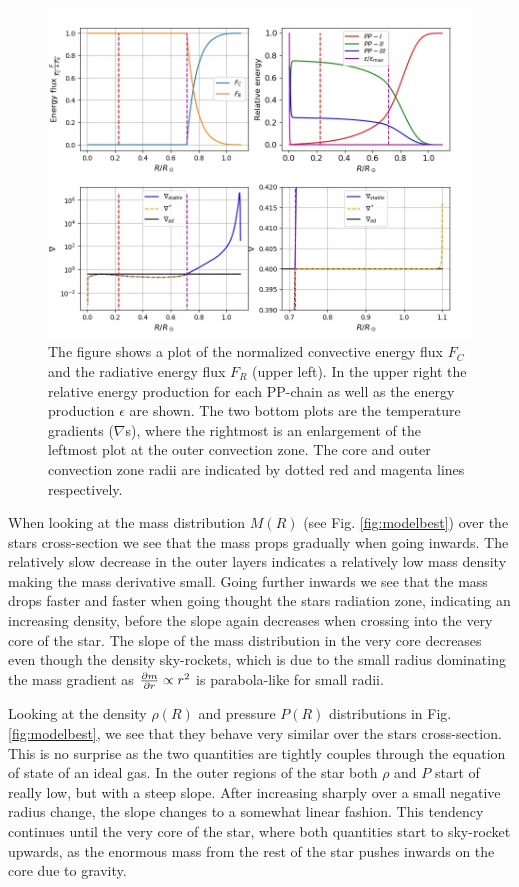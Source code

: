\documentclass{emulateapj}
\begin{document}
	\begin{figure}
		\includegraphics[width=\textwidth]{fluxplot.jpg}
		\caption{The figure shows a plot of the normalized convective energy flux $F_C$ and the radiative energy flux $F_R$ (upper left). In the upper right the relative energy production for each PP-chain as well as the energy production $\epsilon$ are shown. The two bottom plots are the temperature gradients ($\nabla$s), where the rightmost is an enlargement of the leftmost plot at the outer convection zone. The core and outer convection zone radii are indicated by dotted red and magenta lines respectively.}
		\label{fig:flux}
	\end{figure}
	
	When looking at the mass distribution $M(R)$ (see Fig. \ref{fig:modelbest}) over the stars cross-section we see that the mass props gradually when going inwards. The relatively slow decrease in the outer layers indicates a relatively low mass density making the mass derivative small. Going further inwards we see that the mass drops faster and faster when going thought the stars radiation zone, indicating an increasing density, before the slope again decreases when crossing into the very core of the star. The slope of the mass distribution in the very core decreases even though the density sky-rockets, which is due to the small radius dominating the mass gradient as $\pdv{m}{r}\propto r^2$ is parabola-like for small radii.
	
	Looking at the density $\rho(R)$ and pressure $P(R)$ distributions in Fig. \ref{fig:modelbest}, we see that they behave very similar over the stars cross-section. This is no surprise as the two quantities are tightly couples through the equation of state of an ideal gas. In the outer regions of the star both $\rho$ and $P$ start of really low, but with a steep slope. After increasing sharply over a small negative radius change, the slope changes to a somewhat linear fashion. This tendency continues until the very core of the star, where both quantities start to sky-rocket upwards, as the enormous mass from the rest of the star pushes inwards on the core due to gravity. 
	
\end{document}
